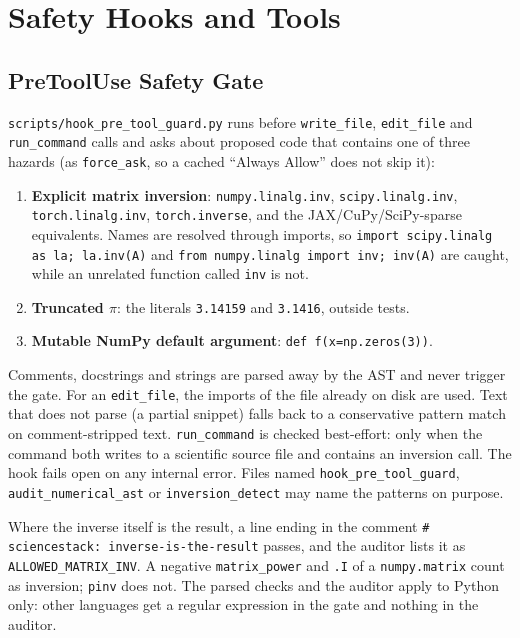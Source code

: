 \documentclass[11pt,a4paper]{report}
\begin{document}
\chapter{Safety Hooks and Tools}

\section{PreToolUse Safety Gate}
\texttt{scripts/hook\_pre\_tool\_guard.py} runs before \texttt{write\_file}, \texttt{edit\_file} and \texttt{run\_command} calls and asks about proposed code that contains one of three hazards (as \texttt{force\_ask}, so a cached ``Always Allow'' does not skip it):
\begin{enumerate}[itemsep=2pt]
    \item \textbf{Explicit matrix inversion}: \texttt{numpy.linalg.inv}, \texttt{scipy.linalg.inv}, \texttt{torch.linalg.inv}, \texttt{torch.inverse}, and the JAX/CuPy/SciPy-sparse equivalents. Names are resolved through imports, so \texttt{import scipy.linalg as la; la.inv(A)} and \texttt{from numpy.linalg import inv; inv(A)} are caught, while an unrelated function called \texttt{inv} is not.
    \item \textbf{Truncated $\pi$}: the literals \texttt{3.14159} and \texttt{3.1416}, outside tests.
    \item \textbf{Mutable NumPy default argument}: \texttt{def f(x=np.zeros(3))}.
\end{enumerate}
Comments, docstrings and strings are parsed away by the AST and never trigger the gate. For an \texttt{edit\_file}, the imports of the file already on disk are used. Text that does not parse (a partial snippet) falls back to a conservative pattern match on comment-stripped text. \texttt{run\_command} is checked best-effort: only when the command both writes to a scientific source file and contains an inversion call. The hook fails open on any internal error. Files named \texttt{hook\_pre\_tool\_guard}, \texttt{audit\_numerical\_ast} or \texttt{inversion\_detect} may name the patterns on purpose.

Where the inverse itself is the result, a line ending in the comment \texttt{\# sciencestack: inverse-is-the-result} passes, and the auditor lists it as \texttt{ALLOWED\_MATRIX\_INV}. A negative \texttt{matrix\_power} and \texttt{.I} of a \texttt{numpy.matrix} count as inversion; \texttt{pinv} does not. The parsed checks and the auditor apply to Python only: other languages get a regular expression in the gate and nothing in the auditor.
\end{document}
